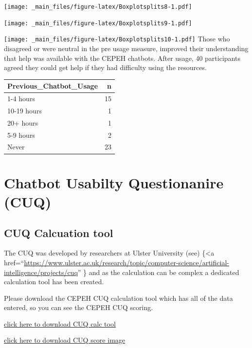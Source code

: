 \documentclass[a4paper, nobind]{templates/ociamthesis}
\begin{document}
\texttt{[image: \_main\_files/figure-latex/Boxplotsplits8-1.pdf]}

\texttt{[image: \_main\_files/figure-latex/Boxplotsplits9-1.pdf]}

\texttt{[image: \_main\_files/figure-latex/Boxplotsplits10-1.pdf]}
Those who disagreed or were neutral in the pre usage measure, improved their understanding that help was available
with the CEPEH chatbots. After usage, 40 participants agreed they could get help if they had difficulty using the
resources.

\begin{longtable}[]{@{}lr@{}}
\toprule()
Previous\_Chatbot\_Usage & n \\
\midrule()
\endhead
1-4 hours & 15 \\
10-19 hours & 1 \\
20+ hours & 1 \\
5-9 hours & 2 \\
Never & 23 \\
\bottomrule()
\end{longtable}

\hypertarget{chatbot-usabilty-questionanire-cuq}{%
\section{Chatbot Usabilty Questionanire (CUQ)}\label{chatbot-usabilty-questionanire-cuq}}

\hypertarget{cuq-calcuation-tool}{%
\subsection{CUQ Calcuation tool}\label{cuq-calcuation-tool}}

The CUQ was developed by researchers at Ulster University (see) \{\textless a
href=``\url{https://www.ulster.ac.uk/research/topic/computer-science/artificial-intelligence/projects/cuq}''
\} and as the calculation can be complex a dedicated calculation tool has been created.

Please download the CEPEH CUQ calculation tool which has all of the data entered, so you can see the CEPEH CUQ scoring.

\href{CUQ-Calculation-Tool.xlsx}{click here to download CUQ calc tool}

\href{cuq.png}{click here to download CUQ score image}
\end{document}
